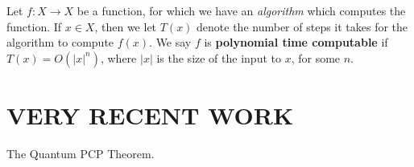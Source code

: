 \documentclass{article}
\theoremstyle{plain}
\theoremstyle{definition}
\begin{document}
Let $f: X \to X$ be a function, for which we have an {\it algorithm} which computes the function. If $x \in X$, then we let $T(x)$ denote the number of steps it takes for the algorithm to compute $f(x)$. We say $f$ is {\bf polynomial time computable} if $T(x) = O(|x|^n)$, where $|x|$ is the size of the input to $x$, for some $n$.

\section{VERY RECENT WORK}

The Quantum PCP Theorem.

\begin{thebibliography}{9}

\end{thebibliography}
\end{document}
